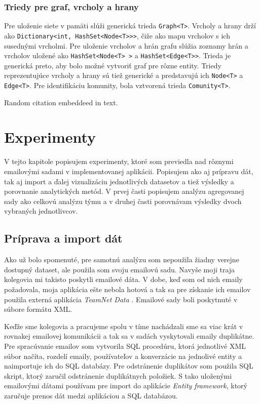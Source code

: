\documentclass[slovak,master,public,dept460,male,cpdeclaration,oneside]{diploma}
\begin{document}
\subsubsection{Triedy pre graf, vrcholy a hrany}
Pre uloženie siete v pamäti slúži generická trieda \texttt{Graph<T>}. Vrcholy a hrany drží ako \texttt{Dictionary<int, HashSet<Node<T>{}>{}>}, čiže ako mapu vrcholov s ich susednými vrcholmi. Pre uloženie vrcholov a hrán grafu slúžia zoznamy hrán a vrcholov uložené ako \texttt{HashSet<Node<T> >} a \texttt{HashSet<Edge<T>{}>}. Trieda je generická preto, aby bolo možné vytvoriť graf pre rôzne entity. Triedy reprezentujúce vrcholy a hrany sú tiež generické a predstavujú ich \texttt{Node<T>} a \texttt{Edge<T>}. Pre identifikáciu komunity, bola vztvorená trieda \texttt{Comunity<T>}.



Random citation \cite{DUMMY:1} embeddeed in text.

\section{Experimenty}
V tejto kapitole popisujem experimenty, ktoré som previedla nad rôznymi emailovými sadami v implementovanej aplikácii. Popisujem ako aj prípravu dát, tak aj import a ďalej vizualizáciu jednotlivých datasetov a tiež výsledky a porovnanie analytických metód. V prvej časti popisujem analýzu agregovanej sady ako celkovú analýzu týmu a v druhej časti porovnávam výsledky dvoch vybraných jednotlivcov.


\subsection{Príprava a import dát}
Ako už bolo spomenuté, pre samotnú analýzu som nepoužila žiadny verejne dostupný dataset, ale použila som svoju emailovú sadu. Navyše moji traja kolegovia mi takisto poskytli emailové dáta. V dobe, keď som od nich emaily požadovala, moja aplikácia ešte nebola hotová a tak sa pre získanie ich emailov použila externá aplikácia \textit{TeamNet Data} \cite{5}. Emailové sady boli poskytnuté v súbore formátu XML.


Keďže sme kolegovia a pracujeme spolu v tíme nachádzali sme sa viac krát v rovnakej emailovej komunikácii a tak sa v sadách vyskytovali emaily duplikátne. Pre spracúvanie emailov som vytvorila SQL procedúru, ktorá jednotlivé XML súbor načíta, rozdelí emaily, používateľov a konverzácie na jednolivé entity a naimportuje ich do SQL databázy. Pre odstránenie duplikátov som použila SQL skript, ktorý zaručil odstránenie duplikátnych položiek. S tako uloženými emailovými dátami používam pre import do aplikácie \textit{Entity framework}, ktorý zaručuje prenos dát medzi aplikáciou a SQL databázou.
\end{document}
